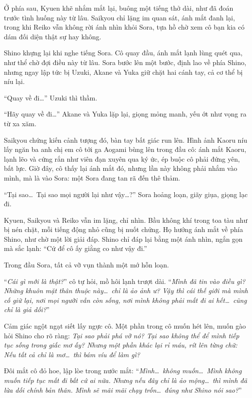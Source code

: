 \documentclass[../main.tex]{subfiles}
\begin{document}
Ở phía sau, Kyuen khẽ nhắm mắt lại, buông một tiếng thở dài, như đã đoán trước tình huống này từ lâu. Saikyou chỉ lặng im quan sát, ánh mắt đanh lại, trong khi Reiko vẫn không rời ánh nhìn khỏi Sora, tựa hồ chờ xem cô bạn kia có dám đối diện thật sự hay không.

Shino khựng lại khi nghe tiếng Sora. Cô quay đầu, ánh mắt lạnh lùng quét qua, như thể chờ đợi điều này từ lâu. Sora bước lên một bước, định lao về phía Shino, nhưng ngay lập tức bị Uzuki, Akane và Yuka giữ chặt hai cánh tay, cả cơ thể bị níu lại.

``Quay về đi\dots'' Uzuki thì thầm.

``Hãy quay về đi\dots'' Akane và Yuka lặp lại, giọng mỏng manh, yếu ớt như vọng ra từ xa xăm.


Saikyou chứng kiến cảnh tượng đó, bàn tay bất giác run lên. Hình ảnh Kaoru níu lấy ngăn ba anh chị em cô tới ga Aogami bùng lên trong đầu cô: ánh mắt Kaoru, lạnh lẽo và cứng rắn như viên đạn xuyên qua ký ức, ép buộc cô phải đứng yên, bất lực. Giờ đây, cô thấy lại ánh mắt đó, nhưng lần này không phải nhắm vào mình, mà là vào Sora: một Sora đang tan rã đến thê thảm.

``Tại sao\dots\ Tại sao mọi người lại như vậy\dots?'' Sora hoảng loạn, giãy giụa, giọng lạc đi.

Kyuen, Saikyou và Reiko vẫn im lặng, chỉ nhìn. Bầu không khí trong toa tàu như bị nén chặt, mỗi tiếng động nhỏ cũng bị nuốt chửng. Họ hướng ánh mắt về phía Shino, như chờ một lời giải đáp. Shino chỉ đáp lại bằng một ánh nhìn, ngắn gọn mà sắc lạnh: ``Cứ để cô ấy giằng co như vậy đi.''

Trong đầu Sora, tất cả vỡ vụn thành một mớ hỗn loạn.

``\textit{Cái gì mới là thật?}'' cô tự hỏi, mồ hôi lạnh trượt dài. ``\textit{Mình đã tin vào điều gì? Những khuôn mặt thân thuộc này\dots\ chỉ là ảo ảnh ư? Vậy thì cái thế giới mà mình cố giữ lại, nơi mọi người vẫn còn sống, nơi mình không phải mất đi ai hết\dots\ cũng chỉ là giả dối?}''

Cảm giác ngột ngạt siết lấy ngực cô. Một phần trong cô muốn hét lên, muốn gào hỏi Shino cho rõ ràng: \textit{Tại sao phải phá vỡ nó? Tại sao không thể để mình tiếp tục sống trong giấc mơ ấy? Nhưng một phần khác lại rỉ máu, rít lên từng chữ: Nếu tất cả chỉ là mơ\dots\ thì bám víu để làm gì?}

Đôi mắt cô đỏ hoe, lập lòe trong nước mắt: ``\textit{Mình\dots\ không muốn\dots\ Mình không muốn tiếp tục mất đi bất cứ ai nữa. Nhưng nếu đây chỉ là ảo mộng\dots\ thì mình đã lừa dối chính bản thân. Mình sẽ mãi mãi chạy trốn\dots\ đúng như Shino nói sao?}''
\end{document}
